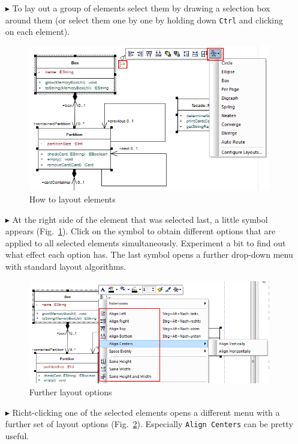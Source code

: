\begin{enumerate}
\item[$\blacktriangleright$] To lay out a group of elements select them by drawing a selection box around them (or select them one by one by holding down \texttt{Ctrl} and clicking on each element).
\begin{figure}[htbp]
\begin{center} 
  \includegraphics[width=\textwidth]{pics/tricks/layoutElements/layoutElements1}
  \caption{How to layout elements}  
  \label{fig_layout01}
\end{center}
\end{figure}
 
\item[$\blacktriangleright$] At the right side of the element that was selected last, a little symbol appears (Fig.~\ref{fig_layout01}).
Click on the symbol to obtain different options that are applied to all selected elements simultaneously.
Experiment a bit to find out what effect each option has.
The last symbol opens a further drop-down menu with standard layout algorithms.

\begin{figure}[htbp]
\begin{center}  \includegraphics[width=\textwidth]{pics/tricks/layoutElements/layoutElements2}
  \caption{Further layout options}  
  \label{fig_layout02} 
\end{center}
\end{figure}

\item[$\blacktriangleright$] Richt-clicking one of the selected elements opens a different menu with a further set of layout options (Fig.~\ref{fig_layout02}).
Especially \texttt{Align Centers} can be pretty useful.
\end{enumerate}
  
